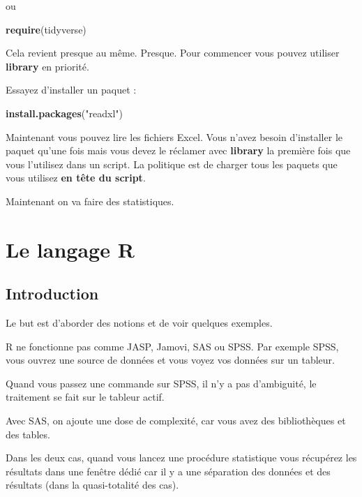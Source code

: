 \documentclass[
]{book}
\newenvironment{Shaded}{\begin{snugshade}}{\end{snugshade}}
\newcommand{\FunctionTok}[1]{\textcolor[rgb]{0.13,0.29,0.53}{\textbf{#1}}}
\newcommand{\NormalTok}[1]{#1}
\newcommand{\StringTok}[1]{\textcolor[rgb]{0.31,0.60,0.02}{#1}}
\begin{document}
ou

\begin{Shaded}
\begin{Highlighting}[]
\FunctionTok{require}\NormalTok{(tidyverse)}
\end{Highlighting}
\end{Shaded}

Cela revient presque au même. Presque. Pour commencer vous pouvez utiliser
\textbf{library} en priorité.

Essayez d'installer un paquet :

\begin{Shaded}
\begin{Highlighting}[]
\FunctionTok{install.packages}\NormalTok{(}\StringTok{"readxl"}\NormalTok{)}
\end{Highlighting}
\end{Shaded}

Maintenant vous pouvez lire les fichiers Excel. Vous n'avez besoin d'installer
le paquet qu'une fois mais vous devez le réclamer avec \textbf{library} la première
fois que vous l'utilisez dans un script. La politique est de charger tous les
paquets que vous utilisez \textbf{en tête du script}.

Maintenant on va faire des statistiques.

\hypertarget{le-langage-r}{%
\chapter{Le langage R}\label{le-langage-r}}

\hypertarget{introduction}{%
\section{Introduction}\label{introduction}}

Le but est d'aborder des notions et de voir quelques exemples.

R ne fonctionne pas comme JASP, Jamovi, SAS ou SPSS. Par exemple SPSS, vous ouvrez une
source de données et vous voyez vos données sur un tableur.

Quand vous passez une commande sur SPSS, il n'y a pas d'ambiguité, le traitement
se fait sur le tableur actif.

Avec SAS, on ajoute une dose de complexité, car vous avez des bibliothèques
et des tables.

Dans les deux cas, quand vous lancez une procédure statistique vous récupérez
les résultats dans une fenêtre dédié car il y a une séparation des données
et des résultats (dans la quasi-totalité des cas).
\end{document}
